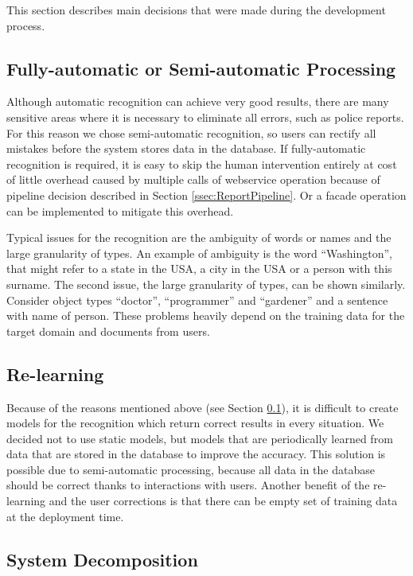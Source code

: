 
This section describes main decisions that were made during the development process.

\subsection{Fully-automatic or Semi-automatic Processing}
\label{ssec:processing}

Although automatic recognition can achieve very good results, there are many
sensitive areas where it is necessary to eliminate all errors, such as
police reports. For this reason we chose semi-automatic recognition, so users
can rectify all mistakes before the system stores data in the database. 
If fully-automatic recognition is required, it is easy
to skip the human intervention entirely at cost of little overhead caused by
multiple calls of webservice operation because of pipeline decision described in
Section \ref{ssec:ReportPipeline}. Or a facade operation can be implemented to
mitigate this overhead.

Typical issues for the recognition are the ambiguity of words or names and the
large granularity of types. An example of ambiguity is the word ``Washington'', that
might refer to a state in the USA, a city in the USA or a person with this surname.
The second issue, the large granularity of types, can be shown similarly.
Consider object types ``doctor'', ``programmer'' and ``gardener'' and a sentence with
name of person. These problems heavily depend on the training data for the
target domain and documents from users.

\subsection{Re-learning}

Because of the reasons mentioned above (see Section \ref{ssec:processing}),
it is difficult to create models for the recognition which return correct
results in every situation. We decided not to use static models, but models that
are periodically learned from data that are stored in the database to improve
the accuracy. This solution is possible due to semi-automatic processing,
because all data in the database should be correct thanks to interactions with
users. Another benefit of the re-learning and the user corrections is that there
can be empty set of training data at the deployment time.

\subsection{System Decomposition}

